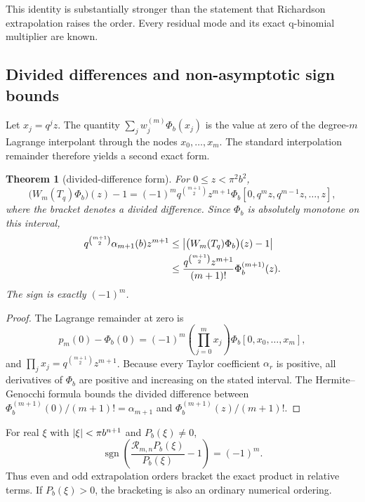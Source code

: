 \documentclass[11pt,oneside]{article}
\numberwithin{equation}{section}
\newtheorem{theorem}{Theorem}[section]
\theoremstyle{definition}
\theoremstyle{remark}
\newcommand{\sgn}{\operatorname{sgn}}
\begin{document}
This identity is substantially stronger than the statement that Richardson
extrapolation raises the order. Every residual mode and its exact q-binomial
multiplier are known.

\subsection{Divided differences and non-asymptotic sign bounds}

Let \(x_j=q^jz\). The quantity
\(\sum_jw_j^{(m)}\Phi_b(x_j)\) is the value at zero of the degree-\(m\)
Lagrange interpolant through the nodes \(x_0,\ldots,x_m\). The standard
interpolation remainder therefore yields a second exact form.

\begin{theorem}[divided-difference form]
\label{p2:thm:divdiff}
For \(0\leq z<\pi^2b^2\),
\begin{equation}
 \bigl(W_m(T_q)\Phi_b\bigr)(z)-1
 =(-1)^m q^{\binom{m+1}{2}}z^{m+1}
 \Phi_b[0,q^mz,q^{m-1}z,\ldots,z],
 \label{p2:eq:divdiff}
\end{equation}
where the bracket denotes a divided difference. Since \(\Phi_b\) is absolutely
monotone on this interval,
\begin{align}
 q^{\binom{m+1}{2}}\alpha_{m+1}(b)z^{m+1}
 &\leq
 \left\lvert \bigl(W_m(T_q)\Phi_b\bigr)(z)-1\right\rvert
 \label{p2:eq:lowerbound}\\
 &\leq
 \frac{q^{\binom{m+1}{2}}z^{m+1}}{(m+1)!}
 \Phi_b^{(m+1)}(z).
 \label{p2:eq:upperbound}
\end{align}
The sign is exactly \((-1)^m\).
\end{theorem}

\begin{proof}
The Lagrange remainder at zero is
\[
 p_m(0)-\Phi_b(0)=(-1)^m\left(\prod_{j=0}^mx_j\right)
 \Phi_b[0,x_0,\ldots,x_m],
\]
and \(\prod_jx_j=q^{\binom{m+1}{2}}z^{m+1}\). Because every Taylor
coefficient \(\alpha_r\) is positive, all derivatives of \(\Phi_b\) are positive
and increasing on the stated interval. The Hermite--Genocchi formula bounds the
divided difference between
\(\Phi_b^{(m+1)}(0)/(m+1)!=\alpha_{m+1}\) and
\(\Phi_b^{(m+1)}(z)/(m+1)!\).
\end{proof}

\begin{corollary}
\label{p2:cor:bracket}
For real \(\xi\) with \(\left\lvert \xi\right\rvert<\pi b^{n+1}\) and \(P_b(\xi)\ne0\),
\begin{equation}
 \sgn\!\left(\frac{\mathcal R_{m,n}P_b(\xi)}{P_b(\xi)}-1\right)=(-1)^m.
 \label{p2:eq:signlaw}
\end{equation}
Thus even and odd extrapolation orders bracket the exact product in relative
terms. If \(P_b(\xi)>0\), the bracketing is also an ordinary numerical ordering.
\end{corollary}
\end{document}
